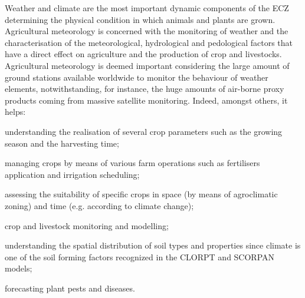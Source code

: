 \documentclass[authoryear,preprint,review,12pt]{elsarticle}
\newcommand{\note}[1]{\emph{\textcolor{red}{#1}}}
\begin{document}


Weather and climate are the most important dynamic components of the ECZ determining the physical condition in which animals and plants are grown.
Agricultural meteorology is concerned with the monitoring of weather and the characterisation of the meteorological, hydrological and pedological factors that have a direct effect on agriculture and the production of crop and livestocks.
Agricultural meteorology is deemed important considering the large amount of ground stations available worldwide to monitor the behaviour of weather elements, notwithstanding, for instance, the huge amounts of air-borne proxy products coming from massive satellite monitoring.
Indeed, amongst others, it helps: %
    \begin{enumerate*}
        \item understanding the realisation of several crop parameters such as the growing season and the harvesting time;  %
        \item managing crops by means of various farm operations such as fertilisers application and irrigation scheduling;
        \item assessing the suitability of specific crops in space (by means of agroclimatic zoning) and time (e.g. according to climate change);
        \item crop and livestock monitoring and modelling;
        \item understanding the spatial distribution of soil types and properties since climate is one of the soil forming factors recognized in the CLORPT \citep{jenny:clorpt:1941} and SCORPAN \citep{McBratney:scorpan:2003} models;
        \item forecasting plant pests and diseases.
    \end{enumerate*}
\end{document}
